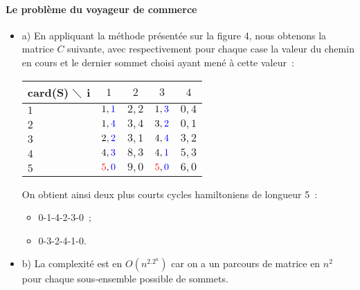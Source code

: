 \paragraph{Le problème du voyageur de commerce}

\begin{itemize}
\item a) En appliquant la méthode présentée sur la figure 4, nous
obtenons la matrice $C$ suivante, avec respectivement pour chaque case la valeur du
chemin en cours et le dernier sommet choisi ayant mené à cette valeur~:
\begin{center}
\begin{tabular}{|l|c|c|c|c|}
\hline  card(S) $\diagdown$ i  & $1$ & $2$ & $3$ & $4$ \\
\hline $1$ & $1,\textcolor{blue}{1}$ & $2,2$ & $1,\textcolor{blue}{3}$ & $0,4$ \\
\hline $2$ & $1,\textcolor{blue}{4}$ & $3,4$ & $3,\textcolor{blue}{2}$ & $0,1$  \\
\hline $3$ & $2,\textcolor{blue}{2}$ & $3,1$ & $4,\textcolor{blue}{4}$ & $3,2$ \\
\hline $4$ & $4,\textcolor{blue}{3}$ & $8,3$ & $4,\textcolor{blue}{1}$ & $5,3$ \\
\hline $5$ & $\textcolor{red}{5},\textcolor{blue}{0}$ & $9,0$ & $\textcolor{red}{5},\textcolor{blue}{0}$ & $6,0$ \\
\hline
\end{tabular}
\end{center}
\vspace{1cm}
On obtient ainsi deux plus courts cycles hamiltoniens de longueur 5~:
\begin{itemize}
\item 0-1-4-2-3-0~;
\item 0-3-2-4-1-0.
\end{itemize}
\item b) La complexité est en $O(n^2.2^n)$ car on a un parcours de
matrice en $n^2$ pour chaque sous-ensemble possible de sommets.
\end{itemize}
